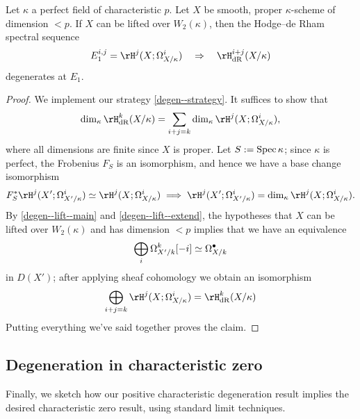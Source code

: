 \begin{theorem}
  \label{degen--lift--degen}
  Let $\kappa$ a perfect field of characteristic $p$. Let $X$ be smooth, proper $\kappa$-scheme of dimension $< p$. If $X$ can be lifted over $W_2(\kappa)$, then the Hodge--de Rham spectral sequence
  \[
    E_1^{i,j} = \rH^j(X;\Omega_{X/\kappa}^i) \quad \Rightarrow \quad
    \rH_\dR^{i+j}(X/\kappa)
  \]
  degenerates at $E_1$.
\end{theorem}

\begin{proof}
  We implement our strategy \cref{degen--strategy}. It suffices to show that
  \[
    \dim_\kappa \rH_\dR^k(X/\kappa) = \sum_{i+j=k} \dim_\kappa \rH^j(X;\Omega_{X/\kappa}^i),
  \]
  where all dimensions are finite since $X$ is proper. Let $S \mathrel{:=} \operatorname{Spec} \kappa$; since $\kappa$ is perfect, the Frobenius $F_S$ is an isomorphism, and hence we have a base change isomorphism
  \[
    F_S^*\rH^j(X';\Omega_{X'/\kappa}^i) \iso \rH^j(X;\Omega_{X/\kappa}^i) \implies \rH^j(X';\Omega_{X'/\kappa}^i) = \dim_\kappa \rH^j(X;\Omega_{X/\kappa}^i).
  \]
  By \cref{degen--lift--main} and \cref{degen--lift--extend}, the hypotheses that $X$ can be lifted over $W_2(\kappa)$ and has dimension $< p$ implies that we have an equivalence
  \[
    \bigoplus_i \Omega_{X'/k}^k[-i] \simeq \Omega_{X/k}^\bullet
  \]
  in $D(X')$; after applying sheaf cohomology we obtain an isomorphism
  \[
    \bigoplus_{i+j=k} \rH^j(X;\Omega_{X/\kappa}^i) = \rH_\dR^k(X/\kappa)
  \]
  Putting everything we've said together proves the claim.
\end{proof}


\subsection{Degeneration in characteristic zero}
\label{degen--final}

Finally, we sketch how our positive characteristic degeneration result implies the desired characteristic zero result, using standard limit techniques.

